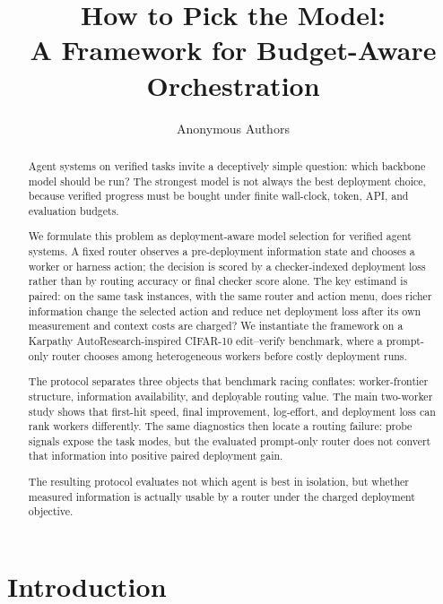 \documentclass{article}
\title{How to Pick the Model:\\
A Framework for Budget-Aware Orchestration}
\author{Anonymous Authors}
\begin{document}
\maketitle

\begin{abstract}
Agent systems on verified tasks invite a deceptively simple question: which backbone model should be run?
The strongest model is not always the best deployment choice, because verified progress must be bought under finite wall-clock, token, API, and evaluation budgets.

We formulate this problem as deployment-aware model selection for verified agent systems.
A fixed router observes a pre-deployment information state and chooses a worker or harness action; the decision is scored by a checker-indexed deployment loss rather than by routing accuracy or final checker score alone.
The key estimand is paired: on the same task instances, with the same router and action menu, does richer information change the selected action and reduce net deployment loss after its own measurement and context costs are charged?
We instantiate the framework on a Karpathy AutoResearch-inspired CIFAR-10 edit--verify benchmark, where a prompt-only router chooses among heterogeneous workers before costly deployment runs.

The protocol separates three objects that benchmark racing conflates: worker-frontier structure, information availability, and deployable routing value.
The main two-worker study shows that first-hit speed, final improvement, log-effort, and deployment loss can rank workers differently.
The same diagnostics then locate a routing failure: probe signals expose the task modes, but the evaluated prompt-only router does not convert that information into positive paired deployment gain.

The resulting protocol evaluates not which agent is best in isolation, but whether measured information is actually usable by a router under the charged deployment objective.
\end{abstract}

\section{Introduction}
\label{sec:intro}
\end{document}

